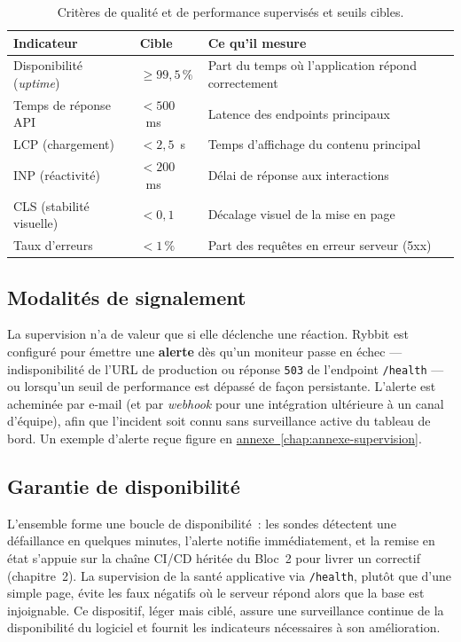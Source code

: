 \begin{table}[htbp]
    \centering
    \renewcommand{\arraystretch}{1.3}
    \begin{tabular}{|p{4cm}|p{3.5cm}|p{6.5cm}|}
        \hline
        \textbf{Indicateur} & \textbf{Cible} & \textbf{Ce qu'il mesure} \\
        \hline
        Disponibilité (\emph{uptime}) & $\geq 99{,}5\,\%$ & Part du temps où l'application répond correctement \\
        \hline
        Temps de réponse API & $< 500$~ms & Latence des endpoints principaux \\
        \hline
        LCP (chargement) & $< 2{,}5$~s & Temps d'affichage du contenu principal \\
        \hline
        INP (réactivité) & $< 200$~ms & Délai de réponse aux interactions \\
        \hline
        CLS (stabilité visuelle) & $< 0{,}1$ & Décalage visuel de la mise en page \\
        \hline
        Taux d'erreurs & $< 1\,\%$ & Part des requêtes en erreur serveur (5xx) \\
        \hline
    \end{tabular}
    \caption{Critères de qualité et de performance supervisés et seuils cibles.}
    \label{tab:supervision}
\end{table}

\subsection{Modalités de signalement}
La supervision n'a de valeur que si elle déclenche une réaction. Rybbit est configuré pour émettre une \textbf{alerte} dès qu'un moniteur passe en échec — indisponibilité de l'URL de production ou réponse \texttt{503} de l'endpoint \texttt{/health} — ou lorsqu'un seuil de performance est dépassé de façon persistante. L'alerte est acheminée par e-mail (et par \emph{webhook} pour une intégration ultérieure à un canal d'équipe), afin que l'incident soit connu sans surveillance active du tableau de bord. Un exemple d'alerte reçue figure en \hyperref[chap:annexe-supervision]{annexe~\ref*{chap:annexe-supervision}}.

\subsection{Garantie de disponibilité}
L'ensemble forme une boucle de disponibilité~: les sondes détectent une défaillance en quelques minutes, l'alerte notifie immédiatement, et la remise en état s'appuie sur la chaîne CI/CD héritée du Bloc~2 pour livrer un correctif (chapitre~2). La supervision de la santé applicative via \texttt{/health}, plutôt que d'une simple page, évite les faux négatifs où le serveur répond alors que la base est injoignable. Ce dispositif, léger mais ciblé, assure une surveillance continue de la disponibilité du logiciel et fournit les indicateurs nécessaires à son amélioration.

